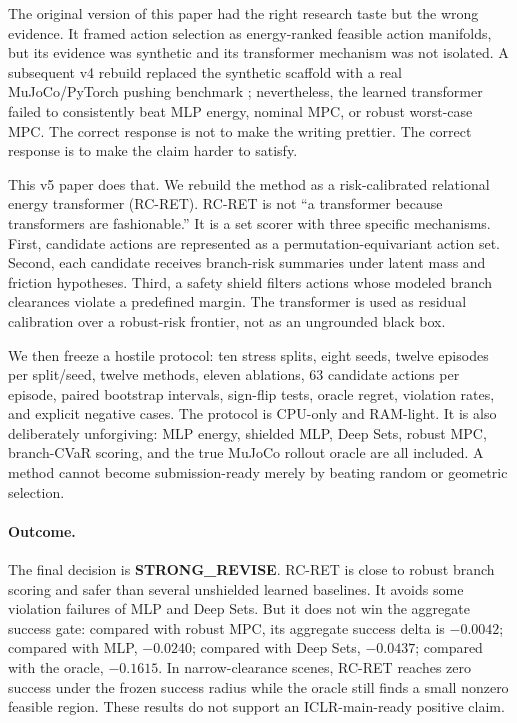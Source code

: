 \documentclass{article}
\newcommand{\method}{RC-RET}
\begin{document}
The original version of this paper had the right research taste but the wrong evidence.  It framed action selection as energy-ranked feasible action manifolds, but its evidence was synthetic and its transformer mechanism was not isolated.  A subsequent v4 rebuild replaced the synthetic scaffold with a real MuJoCo/PyTorch pushing benchmark \citep{todorov2012mujoco}; nevertheless, the learned transformer failed to consistently beat MLP energy, nominal MPC, or robust worst-case MPC.  The correct response is not to make the writing prettier.  The correct response is to make the claim harder to satisfy.

This v5 paper does that.  We rebuild the method as a risk-calibrated relational energy transformer (\method).  \method{} is not ``a transformer because transformers are fashionable.''  It is a set scorer with three specific mechanisms.  First, candidate actions are represented as a permutation-equivariant action set.  Second, each candidate receives branch-risk summaries under latent mass and friction hypotheses.  Third, a safety shield filters actions whose modeled branch clearances violate a predefined margin.  The transformer is used as residual calibration over a robust-risk frontier, not as an ungrounded black box.

We then freeze a hostile protocol: ten stress splits, eight seeds, twelve episodes per split/seed, twelve methods, eleven ablations, 63 candidate actions per episode, paired bootstrap intervals, sign-flip tests, oracle regret, violation rates, and explicit negative cases.  The protocol is CPU-only and RAM-light.  It is also deliberately unforgiving: MLP energy, shielded MLP, Deep Sets, robust MPC, branch-CVaR scoring, and the true MuJoCo rollout oracle are all included.  A method cannot become submission-ready merely by beating random or geometric selection.

\paragraph{Outcome.}
The final decision is \textbf{STRONG\_REVISE}.  \method{} is close to robust branch scoring and safer than several unshielded learned baselines.  It avoids some violation failures of MLP and Deep Sets.  But it does not win the aggregate success gate: compared with robust MPC, its aggregate success delta is $-0.0042$; compared with MLP, $-0.0240$; compared with Deep Sets, $-0.0437$; compared with the oracle, $-0.1615$.  In narrow-clearance scenes, \method{} reaches zero success under the frozen success radius while the oracle still finds a small nonzero feasible region.  These results do not support an ICLR-main-ready positive claim.
\end{document}
